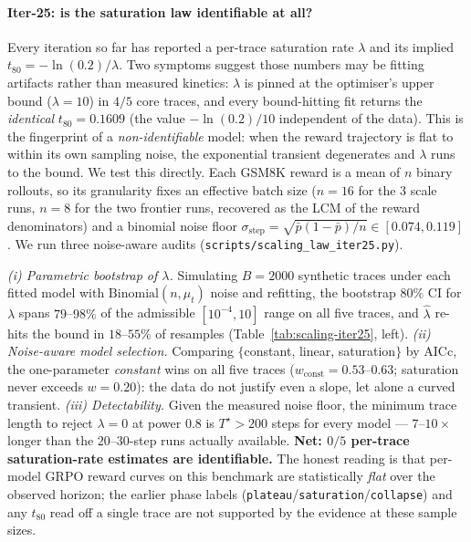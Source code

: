 \paragraph{Iter-25: is the saturation law identifiable at all?}
\label{par:scaling-iter25}
Every iteration so far has reported a per-trace saturation rate
$\lambda$ and its implied $t_{80}=-\ln(0.2)/\lambda$. Two symptoms
suggest those numbers may be fitting artifacts rather than measured
kinetics: $\lambda$ is pinned at the optimiser's upper bound
($\lambda\!=\!10$) in $4/5$ core traces, and every bound-hitting fit
returns the \emph{identical} $t_{80}=0.1609$ (the value $-\ln(0.2)/10$
independent of the data). This is the fingerprint of a
\emph{non-identifiable} model: when the reward trajectory is flat to
within its own sampling noise, the exponential transient degenerates
and $\lambda$ runs to the bound. We test this directly. Each GSM8K
reward is a mean of $n$ binary rollouts, so its granularity fixes an
effective batch size ($n=16$ for the 3 scale runs, $n=8$ for the two
frontier runs, recovered as the LCM of the reward denominators) and a
binomial noise floor $\sigma_{\text{step}}=\sqrt{\bar p(1-\bar p)/n}\in
[0.074,0.119]$. We run three noise-aware audits
(\texttt{scripts/scaling\_law\_iter25.py}).

\emph{(i) Parametric bootstrap of $\lambda$.} Simulating $B=2000$
synthetic traces under each fitted model with $\mathrm{Binomial}(n,\mu_t)$
noise and refitting, the bootstrap $80\%$ CI for $\lambda$ spans
$79$--$98\%$ of the admissible $[10^{-4},10]$ range on all five traces,
and $\hat\lambda$ re-hits the bound in $18$--$55\%$ of resamples
(Table~\ref{tab:scaling-iter25}, left). \emph{(ii) Noise-aware model
selection.} Comparing $\{$constant, linear, saturation$\}$ by AICc, the
one-parameter \emph{constant} wins on all five traces
($w_{\text{const}}=0.53$--$0.63$; saturation never exceeds $w=0.20$):
the data do not justify even a slope, let alone a curved transient.
\emph{(iii) Detectability.} Given the measured noise floor, the minimum
trace length to reject $\lambda=0$ at power $0.8$ is
$T^\star>200$ steps for every model --- $7$--$10\times$ longer than the
$20$--$30$-step runs actually available. \textbf{Net: $0/5$ per-trace
saturation-rate estimates are identifiable.} The honest reading is that
per-model GRPO reward curves on this benchmark are statistically
\emph{flat} over the observed horizon; the earlier phase labels
(\texttt{plateau}/\texttt{saturation}/\texttt{collapse}) and any
$t_{80}$ read off a single trace are not supported by the evidence at
these sample sizes.

